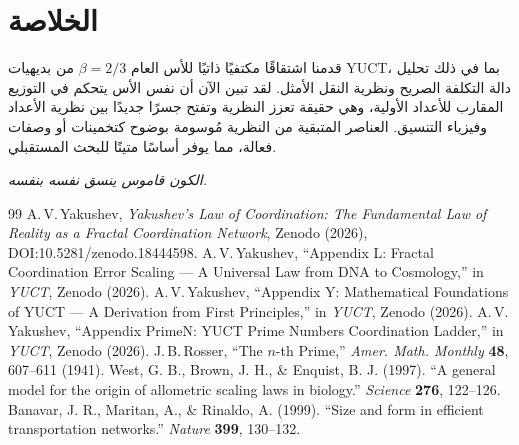 \documentclass[11pt,a4paper]{article}
\begin{document}
	\section{الخلاصة}
	قدمنا اشتقاقًا مكتفيًا ذاتيًا للأس العام \(\beta = 2/3\) من بديهيات YUCT، بما في ذلك تحليل دالة التكلفة الصريح ونظرية النقل الأمثل. لقد تبين الآن أن نفس الأس يتحكم في التوزيع المقارب للأعداد الأولية، وهي حقيقة تعزز النظرية وتفتح جسرًا جديدًا بين نظرية الأعداد وفيزياء التنسيق. العناصر المتبقية من النظرية مُوسومة بوضوح كتخمينات أو وصفات فعالة، مما يوفر أساسًا متينًا للبحث المستقبلي.
	
	\begin{center}
		\textit{الكون قاموس ينسق نفسه بنفسه.}
	\end{center}
	
	\begin{thebibliography}{99}
		A.\,V.\,Yakushev, \emph{Yakushev's Law of Coordination: The Fundamental Law of Reality as a Fractal Coordination Network}, Zenodo (2026), DOI:10.5281/zenodo.18444598.
		A.\,V.\,Yakushev, ``Appendix L: Fractal Coordination Error Scaling — A Universal Law from DNA to Cosmology,'' in \emph{YUCT}, Zenodo (2026).
		A.\,V.\,Yakushev, ``Appendix Y: Mathematical Foundations of YUCT — A Derivation from First Principles,'' in \emph{YUCT}, Zenodo (2026).
		A.\,V.\,Yakushev, ``Appendix PrimeN: YUCT Prime Numbers Coordination Ladder,'' in \emph{YUCT}, Zenodo (2026).
		J.\,B.\,Rosser, ``The \(n\)-th Prime,'' \emph{Amer. Math. Monthly} \textbf{48}, 607--611 (1941).
		West, G. B., Brown, J. H., \& Enquist, B. J. (1997). ``A general model for the origin of allometric scaling laws in biology.'' \emph{Science} \textbf{276}, 122--126.
		Banavar, J. R., Maritan, A., \& Rinaldo, A. (1999). ``Size and form in efficient transportation networks.'' \emph{Nature} \textbf{399}, 130--132.
	\end{thebibliography}
	
\end{document}
